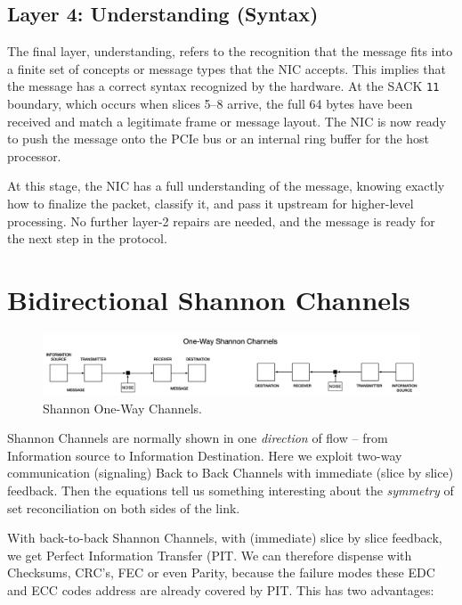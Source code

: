 \documentclass[../../../OAE-SPEC-MAIN.tex]{subfiles}
\begin{document}
\subsection{Layer 4: Understanding (Syntax)}

The final layer, understanding, refers to the recognition that the message fits into a finite set of concepts or message types that the NIC accepts. This implies that the message has a correct syntax recognized by the hardware. At the SACK \texttt{11} boundary, which occurs when slices 5–8 arrive, the full 64 bytes have been received and match a legitimate frame or message layout. The NIC is now ready to push the message onto the PCIe bus or an internal ring buffer for the host processor.

At this stage, the NIC has a full understanding of the message, knowing exactly how to finalize the packet, classify it, and pass it upstream for higher-level processing. No further layer-2 repairs are needed, and the message is ready for the next step in the protocol.

\section{Bidirectional Shannon Channels}

\begin{figure}
\includegraphics[width=\textwidth]{FIGURES/One-Way-Shannon.png}
  \caption{Shannon One-Way Channels. }
\end{figure}

Shannon Channels are normally shown in one \emph{direction} of flow -- from Information source to Information Destination. Here we exploit two-way communication (signaling) Back to Back Channels with immediate (slice by slice) feedback. Then the equations tell us something interesting about the \emph{symmetry} of set reconciliation on both sides of the link.

With back-to-back Shannon Channels, with (immediate) slice by slice feedback, we get Perfect Information Transfer (PIT. We can therefore dispense with Checksums, CRC's, FEC or even Parity,  because the failure modes these EDC and ECC codes address are already covered by PIT.  This has two advantages:
\end{document}
